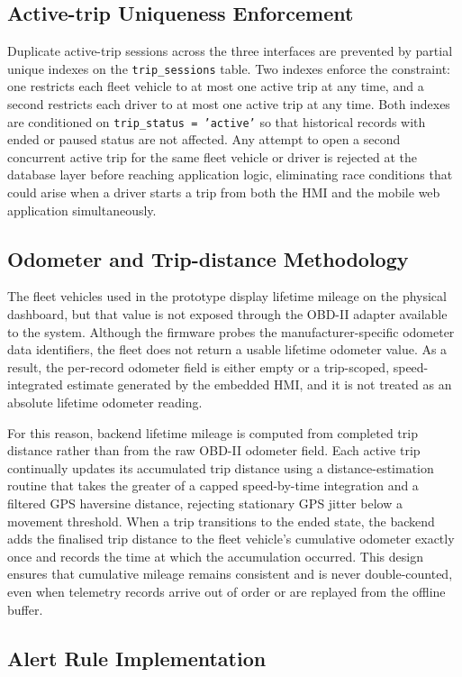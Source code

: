\subsection{Active-trip Uniqueness Enforcement}
Duplicate active-trip sessions across the three interfaces are prevented by partial unique indexes on the \texttt{trip\_sessions} table. Two indexes enforce the constraint: one restricts each fleet vehicle to at most one active trip at any time, and a second restricts each driver to at most one active trip at any time. Both indexes are conditioned on \texttt{trip\_status = 'active'} so that historical records with ended or paused status are not affected. Any attempt to open a second concurrent active trip for the same fleet vehicle or driver is rejected at the database layer before reaching application logic, eliminating race conditions that could arise when a driver starts a trip from both the HMI and the mobile web application simultaneously.

\subsection{Odometer and Trip-distance Methodology}
The fleet vehicles used in the prototype display lifetime mileage on the physical dashboard, but that value is not exposed through the OBD-II adapter available to the system. Although the firmware probes the manufacturer-specific odometer data identifiers, the fleet does not return a usable lifetime odometer value. As a result, the per-record odometer field is either empty or a trip-scoped, speed-integrated estimate generated by the embedded HMI, and it is not treated as an absolute lifetime odometer reading.

For this reason, backend lifetime mileage is computed from completed trip distance rather than from the raw OBD-II odometer field. Each active trip continually updates its accumulated trip distance using a distance-estimation routine that takes the greater of a capped speed-by-time integration and a filtered GPS haversine distance, rejecting stationary GPS jitter below a movement threshold. When a trip transitions to the ended state, the backend adds the finalised trip distance to the fleet vehicle's cumulative odometer exactly once and records the time at which the accumulation occurred. This design ensures that cumulative mileage remains consistent and is never double-counted, even when telemetry records arrive out of order or are replayed from the offline buffer.

\subsection{Alert Rule Implementation}
\label{sec:alerts}


